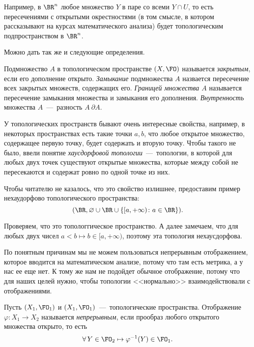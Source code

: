 	Например, в $\BR^n$ любое множество $Y$ в паре со всеми $Y \cap U$, то есть пересечениями с открытыми окрестностями (в том смысле, в котором рассказывают на курсах математического анализа) будет топологическим подпространством в $\BR^n$.

	Можно дать так же и следующие определения.
	
\begin{definition}
	Подмножество $A$ в топологическом пространстве $(X, \FO)$ называется \emph{закрытым}, если его дополнение открыто. \emph{Замыкание} подмножества $A$ назвается пересечение всех закрытых множеств, содержащих его. \emph{Границей множества $A$} называется пересечение замыкания множества и замыкания его дополнения. \emph{Внутренность} множества $A$~---~разность $A \ \partial A$.
\end{definition}

	У топологических пространств бывают очень интересные свойства, например, в некоторых пространствах есть такие точки $a, b$, что любое открытое множество, содержащее первую точку, будет содержать и вторую точку. Чтобы такого не было, ввели понятие \emph{хаусдорфовой топологии}~---~топологии, в которой для любых двух точек существуют открытые множества, которые между собой не пересекаются и содержат ровно по одной точке из них.
	
\begin{example}
	Чтобы читателю не казалось, что это свойство излишнее, предоставим пример нехаудорфово топологического пространства:
	$$(\BR, \varnothing \cup \BR \cup \lbrace [a, +\infty) \colon a \in \BR \rbrace).$$
	
	Проверяем, что это топологгическое пространство. А далее замечаем, что для любых двух чисел $a < b \mapsto b \in [a, +\infty)$, поэтому эта топология нехаусдорфова. 
\end{example}


	По понятным причинам мы не можем пользоваться непрерывным отображением, которое вводится на математическом анализе, потому что там есть метрика, а у нас ее еще нет. К тому же нам не подойдет обычное отображение, потому что для наших целей нужно, чтобы топологии <<нормально>> взаимодействовали с отображениями.
	
\begin{definition}
	Пусть $(X_1, \FO_1)$ и $(X_1, \FO_1)$~---~топологические пространства. Отображение $\varphi \colon X_1 \to X_2$ называется \emph{непрерывным}, если прообраз любого открытого множества открыто, то есть
	$$\forall \!\ Y \in \FO_2 \mapsto \varphi^{-1}(Y) \in \FO_1.$$
\end{definition}

